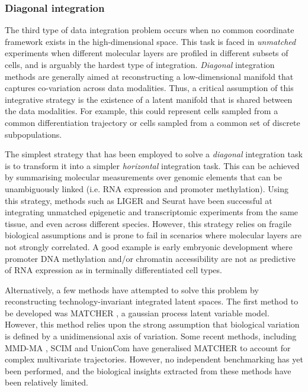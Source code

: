 \subsubsection{Diagonal integration}

The third type of data integration problem occurs when no common coordinate framework exists in the high-dimensional space. This task is faced in \textit{unmatched} experiments when different molecular layers are profiled in different subsets of cells, and is arguably the hardest type of integration. \textit{Diagonal} integration methods are generally aimed at reconstructing a low-dimensional manifold that captures co-variation across data modalities. Thus, a critical assumption of this integrative strategy is the existence of a latent manifold that is shared between the data modalities. For example, this could represent cells sampled from a common differentiation trajectory or cells sampled from a common set of discrete subpopulations.

The simplest strategy that has been employed to solve a \textit{diagonal} integration task is to transform it into a simpler \textit{horizontal} integration task. This can be achieved by summarising molecular measurements over genomic elements that can be unambiguously linked (i.e. RNA expression and promoter methylation). Using this strategy, methods such as LIGER \cite{Welch2019} and Seurat \cite{Stuart2019b} have been successful at integrating unmatched epigenetic and transcriptomic experiments from the same tissue, and even across different species. However, this strategy relies on fragile biological assumptions and is prone to fail in scenarios where molecular layers are not strongly correlated. A good example is early embryonic development where promoter DNA methylation and/or chromatin accessibility are not as predictive of RNA expression \cite{Argelaguet2019} as in terminally differentiated cell types. 

Alternatively, a few methods have attempted to solve this problem by reconstructing technology-invariant integrated latent spaces. The first method to be developed was MATCHER \cite{Welch2017}, a gaussian process latent variable model. However, this method relies upon the strong assumption that biological variation is defined by a unidimensional axis of variation. Some recent methods, including MMD-MA \cite{Liu2019a}, SCIM \cite{Stark2020} and UnionCom \cite{Cao2020} have generalised MATCHER to account for complex multivariate trajectories. However, no independent benchmarking has yet been performed, and the biological insights extracted from these methods have been relatively limited. 


